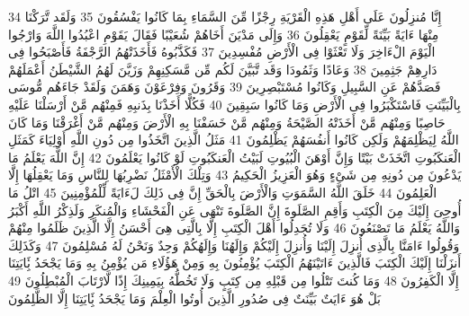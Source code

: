 \documentclass[20pt,a4paper]{article}
\begin{document}
{\tiny\colorbox{cl_aya}{34}} إِنَّا مُنزِلُونَ عَلَى أَهْلِ هَذِهِ الْقَرْيَةِ رِجْزًا مِّنَ السَّمَاءِ بِمَا كَانُوا يَفْسُقُونَ
{\tiny\colorbox{cl_aya}{35}} وَلَقَد تَّرَكْنَا مِنْهَا ءَايَةً بَيِّنَةً لِّقَوْمٍ يَعْقِلُونَ
{\tiny\colorbox{cl_aya}{36}} وَإِلَى مَدْيَنَ أَخَاهُمْ شُعَيْبًا فَقَالَ يَقَوْمِ اعْبُدُوا اللَّهَ وَارْجُوا الْيَوْمَ الْءَاخِرَ وَلَا تَعْثَوْا فِى الْأَرْضِ مُفْسِدِينَ
{\tiny\colorbox{cl_aya}{37}} فَكَذَّبُوهُ فَأَخَذَتْهُمُ الرَّجْفَةُ فَأَصْبَحُوا فِى دَارِهِمْ جَثِمِينَ
{\tiny\colorbox{cl_aya}{38}} وَعَادًا وَثَمُودَا وَقَد تَّبَيَّنَ لَكُم مِّن مَّسَكِنِهِمْ وَزَيَّنَ لَهُمُ الشَّيْطَنُ أَعْمَلَهُمْ فَصَدَّهُمْ عَنِ السَّبِيلِ وَكَانُوا مُسْتَبْصِرِينَ
{\tiny\colorbox{cl_aya}{39}} وَقَرُونَ وَفِرْعَوْنَ وَهَمَنَ وَلَقَدْ جَاءَهُم مُّوسَى بِالْبَيِّنَتِ فَاسْتَكْبَرُوا فِى الْأَرْضِ وَمَا كَانُوا سَبِقِينَ
{\tiny\colorbox{cl_aya}{40}} فَكُلًّا أَخَذْنَا بِذَنبِهِ فَمِنْهُم مَّنْ أَرْسَلْنَا عَلَيْهِ حَاصِبًا وَمِنْهُم مَّنْ أَخَذَتْهُ الصَّيْحَةُ وَمِنْهُم مَّنْ خَسَفْنَا بِهِ الْأَرْضَ وَمِنْهُم مَّنْ أَغْرَقْنَا وَمَا كَانَ اللَّهُ لِيَظْلِمَهُمْ وَلَكِن كَانُوا أَنفُسَهُمْ يَظْلِمُونَ
{\tiny\colorbox{cl_aya}{41}} مَثَلُ الَّذِينَ اتَّخَذُوا مِن دُونِ اللَّهِ أَوْلِيَاءَ كَمَثَلِ الْعَنكَبُوتِ اتَّخَذَتْ بَيْتًا وَإِنَّ أَوْهَنَ الْبُيُوتِ لَبَيْتُ الْعَنكَبُوتِ لَوْ كَانُوا يَعْلَمُونَ
{\tiny\colorbox{cl_aya}{42}} إِنَّ اللَّهَ يَعْلَمُ مَا يَدْعُونَ مِن دُونِهِ مِن شَىْءٍ وَهُوَ الْعَزِيزُ الْحَكِيمُ
{\tiny\colorbox{cl_aya}{43}} وَتِلْكَ الْأَمْثَلُ نَضْرِبُهَا لِلنَّاسِ وَمَا يَعْقِلُهَا إِلَّا الْعَلِمُونَ
{\tiny\colorbox{cl_aya}{44}} خَلَقَ اللَّهُ السَّمَوَتِ وَالْأَرْضَ بِالْحَقِّ إِنَّ فِى ذَلِكَ لَءَايَةً لِّلْمُؤْمِنِينَ
{\tiny\colorbox{cl_aya}{45}} اتْلُ مَا أُوحِىَ إِلَيْكَ مِنَ الْكِتَبِ وَأَقِمِ الصَّلَوةَ إِنَّ الصَّلَوةَ تَنْهَى عَنِ الْفَحْشَاءِ وَالْمُنكَرِ وَلَذِكْرُ اللَّهِ أَكْبَرُ وَاللَّهُ يَعْلَمُ مَا تَصْنَعُونَ
{\tiny\colorbox{cl_aya}{46}} وَلَا تُجَدِلُوا أَهْلَ الْكِتَبِ إِلَّا بِالَّتِى هِىَ أَحْسَنُ إِلَّا الَّذِينَ ظَلَمُوا مِنْهُمْ وَقُولُوا ءَامَنَّا بِالَّذِى أُنزِلَ إِلَيْنَا وَأُنزِلَ إِلَيْكُمْ وَإِلَهُنَا وَإِلَهُكُمْ وَحِدٌ وَنَحْنُ لَهُ مُسْلِمُونَ
{\tiny\colorbox{cl_aya}{47}} وَكَذَلِكَ أَنزَلْنَا إِلَيْكَ الْكِتَبَ فَالَّذِينَ ءَاتَيْنَهُمُ الْكِتَبَ يُؤْمِنُونَ بِهِ وَمِنْ هَؤُلَاءِ مَن يُؤْمِنُ بِهِ وَمَا يَجْحَدُ بَِٔايَتِنَا إِلَّا الْكَفِرُونَ
{\tiny\colorbox{cl_aya}{48}} وَمَا كُنتَ تَتْلُوا مِن قَبْلِهِ مِن كِتَبٍ وَلَا تَخُطُّهُ بِيَمِينِكَ إِذًا لَّارْتَابَ الْمُبْطِلُونَ
{\tiny\colorbox{cl_aya}{49}} بَلْ هُوَ ءَايَتٌ بَيِّنَتٌ فِى صُدُورِ الَّذِينَ أُوتُوا الْعِلْمَ وَمَا يَجْحَدُ بَِٔايَتِنَا إِلَّا الظَّلِمُونَ
\end{document}
